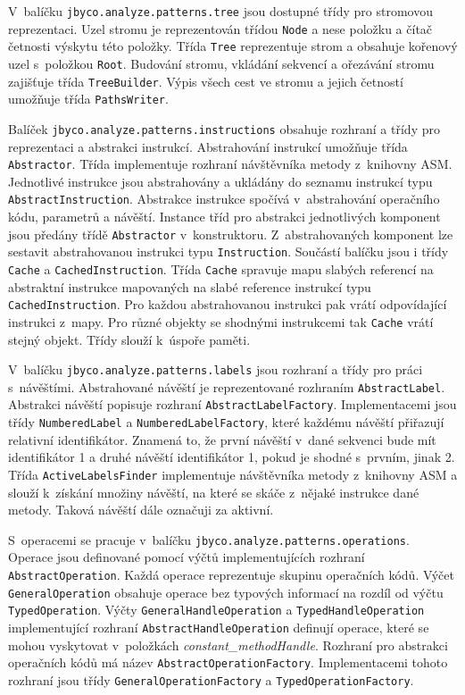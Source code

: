 V~balíčku \texttt{jbyco.analyze.patterns.tree} jsou dostupné třídy pro stromovou reprezentaci. Uzel stromu je reprezentován třídou \texttt{Node} a nese položku a čítač četnosti výskytu této položky. Třída \texttt{Tree} reprezentuje strom a obsahuje kořenový uzel s~položkou \texttt{Root}. Budování stromu, vkládání sekvencí a ořezávání stromu zajišťuje třída \texttt{TreeBuilder}. Výpis všech cest ve stromu a jejich četností umožňuje třída \texttt{PathsWriter}.

Balíček \texttt{jbyco.analyze.patterns.instructions} obsahuje rozhraní a třídy pro reprezentaci a abstrakci instrukcí. Abstrahování instrukcí umožňuje třída \texttt{Abstractor}. Třída implementuje rozhraní návštěvníka metody z~knihovny ASM. Jednotlivé instrukce jsou abstrahovány a ukládány do seznamu instrukcí typu \texttt{AbstractInstruction}. Abstrakce instrukce spočívá v~abstrahování operačního kódu, parametrů a návěští. Instance tříd pro abstrakci jednotlivých komponent jsou předány třídě \texttt{Abstractor} v~konstruktoru. Z~abstrahovaných komponent lze sestavit abstrahovanou instrukci typu \texttt{Instruction}. Součástí balíčku jsou i třídy \texttt{Cache} a \texttt{CachedInstruction}. Třída \texttt{Cache} spravuje mapu slabých referencí na abstraktní instrukce mapovaných na slabé reference instrukcí typu \texttt{CachedInstruction}. Pro každou abstrahovanou instrukci pak vrátí odpovídající instrukci z~mapy. Pro různé objekty se shodnými instrukcemi tak \texttt{Cache} vrátí stejný objekt. Třídy slouží k~úspoře paměti.

V~balíčku \texttt{jbyco.analyze.patterns.labels} jsou rozhraní a třídy pro práci s~návěštími. Abstrahované návěští je reprezentované rozhraním \texttt{AbstractLabel}. Abstrakci návěští popisuje rozhraní \texttt{AbstractLabelFactory}. Implementacemi jsou třídy \texttt{NumberedLabel} a \texttt{NumberedLabelFactory}, které každému návěští přiřazují relativní identifikátor. Znamená to, že první návěští v~dané sekvenci bude mít identifikátor 1 a druhé návěští identifikátor 1, pokud je shodné s~prvním, jinak 2. Třída \texttt{ActiveLabelsFinder} implementuje návštěvníka metody z~knihovny ASM a slouží k~získání množiny návěští, na které se skáče z~nějaké instrukce dané metody. Taková návěští dále označuji za aktivní.

S~operacemi se pracuje v~balíčku \texttt{jbyco.analyze.patterns.operations}. Operace jsou definované pomocí výčtů implementujících rozhraní \texttt{AbstractOperation}. Každá operace reprezentuje skupinu operačních kódů. Výčet \texttt{GeneralOperation} obsahuje operace bez typových informací na rozdíl od výčtu \texttt{TypedOperation}. Výčty \texttt{GeneralHandleOperation} a \texttt{TypedHandleOperation} implementující rozhraní \texttt{AbstractHandleOperation} definují operace, které se mohou vyskytovat v~položkách \textit{constant\_methodHandle}. Rozhraní pro abstrakci operačních kódů má název \texttt{AbstractOperationFactory}. Implementacemi tohoto rozhraní jsou třídy \texttt{GeneralOperationFactory} a \texttt{TypedOperationFactory}. 

